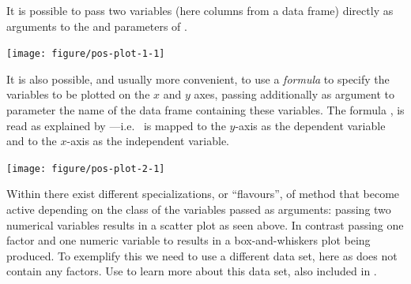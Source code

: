 \documentclass[krantz2]{krantz}\usepackage{knitr}%
\begin{document}
It is possible to pass two variables (here columns from a data frame) directly as arguments to the  and  parameters of .



\begin{knitrout}\footnotesize
{}\color{fgcolor}\begin{kframe}
\begin{alltt}
\hlopt{$}\hlopt{$}
\end{alltt}
\end{kframe}

{\centering \texttt{[image: figure/pos-plot-1-1]} 

}



\end{knitrout}

It is also possible, and usually more convenient, to use a \emph{formula} to specify the variables to be plotted on the $x$ and $y$ axes, passing additionally as argument to  parameter  the name of the data frame containing these variables. The formula , is read as  explained by ---i.e.\  is mapped to the $y$-axis as the dependent variable and  to the $x$-axis as the independent variable.
\begin{knitrout}\footnotesize
{}\color{fgcolor}\begin{kframe}
\begin{alltt}
 \hlopt{~}   
\end{alltt}
\end{kframe}

{\centering \texttt{[image: figure/pos-plot-2-1]} 

}



\end{knitrout}

Within \Rlang there exist different specializations, or ``flavours'', of method  that become active depending on the class of the variables passed as arguments: passing two numerical variables results in a scatter plot as seen above. In contrast passing one factor and one numeric variable to  results in a box-and-whiskers plot being produced. To exemplify this we need to use a different data set, here  as  does not contain any factors. Use  to learn more about this data set, also included in \Rpgrm .
\end{document}
